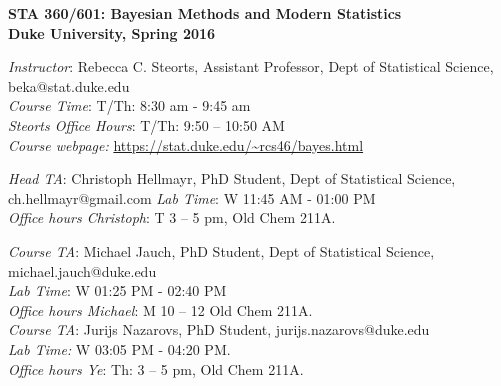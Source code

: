\documentclass[11pt]{article}
\date{}
\begin{document}

\begin{center}
{\Large\bf STA 360/601: Bayesian Methods and Modern Statistics} \\

{\Large\bf Duke University, Spring 2016} \\
\end{center}

\emph{Instructor}: Rebecca C. Steorts,  Assistant Professor, Dept of Statistical Science, beka@stat.duke.edu\\
\emph{Course Time}: T/Th: 8:30 am - 9:45 am\\
\emph{Steorts Office Hours}: T/Th: 9:50 -- 10:50 AM \\
\emph{Course webpage:} \url{https://stat.duke.edu/~rcs46/bayes.html} \\
\vspace*{1em}

\emph{Head TA}: Christoph Hellmayr, PhD Student, Dept of Statistical Science, ch.hellmayr@gmail.com
\emph{Lab Time}: W 11:45 AM - 01:00 PM\\
\emph{Office hours Christoph}: T 3 -- 5 pm, Old Chem 211A. \\
\vspace*{1em}


\emph{Course TA}: Michael Jauch, PhD Student, Dept of Statistical Science,  michael.jauch@duke.edu\\
\emph{Lab Time}: W 01:25 PM - 02:40 PM \\
\emph{Office hours Michael}: M 10 -- 12 Old Chem 211A.\\


\emph{Course TA}: Jurijs Nazarovs, PhD Student,  jurijs.nazarovs@duke.edu\\
\emph{Lab Time:} W 03:05 PM - 04:20 PM.\\
\emph{Office hours Ye}: Th: 3 -- 5 pm, Old Chem 211A. \\
\vspace*{1em}
\end{document}
